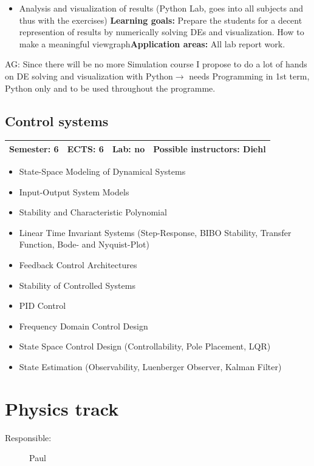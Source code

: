 \documentclass[12pt,twoside,fleqn,a4paper]{article}
\newcommand{\ag}[1]{{\color{blue}AG: #1}}  %
\newcommand{\goalapps}[2]{\newline\textbf{Learning goals:} #1\newline\textbf{Application areas:} #2}
\begin{document}
\begin{itemize}
\item Analysis and visualization of results (Python Lab, goes into all subjects and thus with the exercises)
\goalapps{Prepare the students for a decent represention of results by numerically solving DEs and visualization. How to make a meaningful viewgraph}{All lab report work.}
\end{itemize}
\ag{Since there will be no more Simulation course I propose to do a lot of hands on DE solving and visualization with Python$\rightarrow$ needs Programming in 1st term, Python only and to be used throughout the programme.}

\subsection{Control systems}
\begin{tabular}{llll} \hline
\textbf{Semester:} 6 & \textbf{ECTS:} 6 & \textbf{Lab:} no & \textbf{Possible instructors:} Diehl\\
\hline
\end{tabular}

\begin{itemize}
\setlength\itemsep{0cm}
\item State-Space Modeling of Dynamical Systems
\item Input-Output System Models
\item Stability and Characteristic Polynomial
\item Linear Time Invariant Systems (Step-Response, BIBO Stability, Transfer Function, Bode- and Nyquist-Plot)
\item Feedback Control Architectures
\item Stability of Controlled Systems
\item PID Control
\item Frequency Domain Control Design
\item State Space Control Design (Controllability, Pole Placement, LQR)
\item State Estimation (Observability, Luenberger Observer, Kalman Filter)
\end{itemize}


\newpage
\section{Physics track}
\begin{description}
\item[Responsible:] Paul
\end{description}
\vspace{1 mm}
\end{document}
